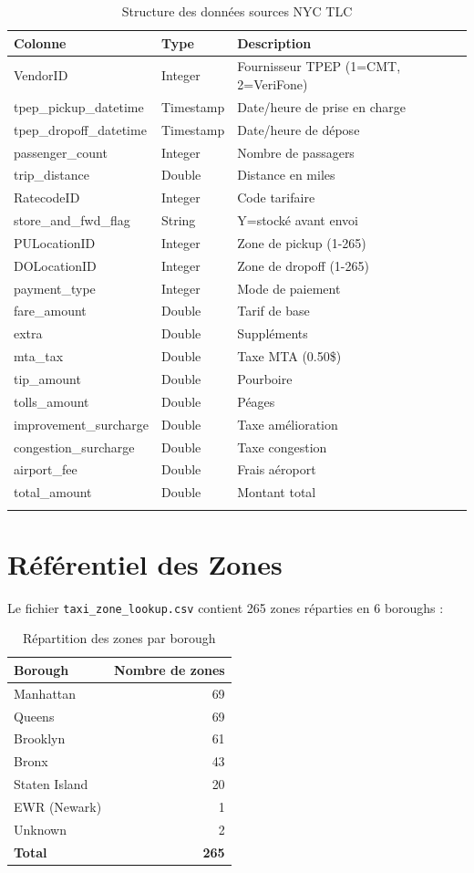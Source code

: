 \documentclass[12pt,a4paper]{report}
\begin{document}
\begin{longtable}{@{}llp{6cm}@{}}
\toprule
\textbf{Colonne} & \textbf{Type} & \textbf{Description} \\
\midrule
\endhead
VendorID & Integer & Fournisseur TPEP (1=CMT, 2=VeriFone) \\
tpep\_pickup\_datetime & Timestamp & Date/heure de prise en charge \\
tpep\_dropoff\_datetime & Timestamp & Date/heure de dépose \\
passenger\_count & Integer & Nombre de passagers \\
trip\_distance & Double & Distance en miles \\
RatecodeID & Integer & Code tarifaire \\
store\_and\_fwd\_flag & String & Y=stocké avant envoi \\
PULocationID & Integer & Zone de pickup (1-265) \\
DOLocationID & Integer & Zone de dropoff (1-265) \\
payment\_type & Integer & Mode de paiement \\
fare\_amount & Double & Tarif de base \\
extra & Double & Suppléments \\
mta\_tax & Double & Taxe MTA (0.50\$) \\
tip\_amount & Double & Pourboire \\
tolls\_amount & Double & Péages \\
improvement\_surcharge & Double & Taxe amélioration \\
congestion\_surcharge & Double & Taxe congestion \\
airport\_fee & Double & Frais aéroport \\
total\_amount & Double & Montant total \\
\bottomrule
\caption{Structure des données sources NYC TLC}
\end{longtable}

\section{Référentiel des Zones}

Le fichier \texttt{taxi\_zone\_lookup.csv} contient 265 zones réparties en 6 boroughs :

\begin{table}[H]
\centering
\caption{Répartition des zones par borough}
\begin{tabular}{@{}lr@{}}
\toprule
\textbf{Borough} & \textbf{Nombre de zones} \\
\midrule
Manhattan & 69 \\
Queens & 69 \\
Brooklyn & 61 \\
Bronx & 43 \\
Staten Island & 20 \\
EWR (Newark) & 1 \\
Unknown & 2 \\
\midrule
\textbf{Total} & \textbf{265} \\
\bottomrule
\end{tabular}
\end{table}
\end{document}
